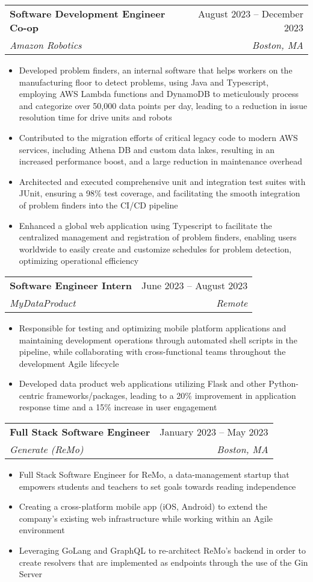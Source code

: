 \documentclass[letterpaper,11pt]{article}
\makeatletter
\newcommand{\resumeItem}[1]{
  \item\small{
    {#1 \vspace{-2pt}}
  }
}
\newcommand{\resumeSubheading}[4]{
  \vspace{-2pt}\item
    \begin{tabular*}{0.97\textwidth}[t]{l@{\extracolsep{\fill}}r}
      \textbf{#1} & #2 \\
      \textit{\small#3} & \textit{\small #4} \\
    \end{tabular*}\vspace{-7pt}
}
\newcommand{\resumeItemListStart}{\begin{itemize}}
\newcommand{\resumeItemListEnd}{\end{itemize}\vspace{-5pt}}
\makeatother
\begin{document}
    \resumeSubheading
      {Software Development Engineer Co-op}{August 2023 -- December 2023}
      {Amazon Robotics}{Boston, MA}
      \resumeItemListStart
      \resumeItem{Developed problem finders, an internal software that helps workers on the manufacturing floor to detect problems, using Java and Typescript, employing AWS Lambda functions and DynamoDB to meticulously process and categorize over 50,000 data points per day, leading to a reduction in issue resolution time for drive units and robots}
      \resumeItem{Contributed to the migration efforts of critical legacy code to modern AWS services, including Athena DB and custom data lakes, resulting in an increased performance boost, and a large reduction in maintenance overhead}
      \resumeItem{Architected and executed comprehensive unit and integration test suites with JUnit, ensuring a 98\% test coverage, and facilitating the smooth integration of problem finders into the CI/CD pipeline}
      \resumeItem{Enhanced a global web application using Typescript to facilitate the centralized management and registration of problem finders, enabling users worldwide to easily create and customize schedules for problem detection, optimizing operational efficiency}
      \resumeItemListEnd

     \resumeSubheading
      {Software Engineer Intern}{June 2023 -- August 2023}
      {MyDataProduct}{Remote}
      \resumeItemListStart
        \resumeItem{Responsible for testing and optimizing mobile platform applications and maintaining development operations through automated shell scripts in the pipeline, while collaborating with cross-functional teams throughout the development Agile lifecycle}
        \resumeItem{Developed data product web applications utilizing Flask and other Python-centric frameworks/packages, leading to a 20\% improvement in application response time and a 15\% increase in user engagement}
      \resumeItemListEnd

    \resumeSubheading
      {Full Stack Software Engineer}{January 2023 -- May 2023}
      {Generate (ReMo)}{Boston, MA}
      \resumeItemListStart
        \resumeItem{Full Stack Software Engineer for ReMo, a data-management startup that empowers students and teachers to set goals towards reading independence}
        \resumeItem{Creating a cross-platform mobile app (iOS, Android) to extend the company’s existing web infrastructure while working within an Agile environment}
        \resumeItem{Leveraging GoLang and GraphQL to re-architect ReMo’s backend in order to create resolvers that are implemented as endpoints through the use of the Gin Server}
      \resumeItemListEnd
\end{document}
